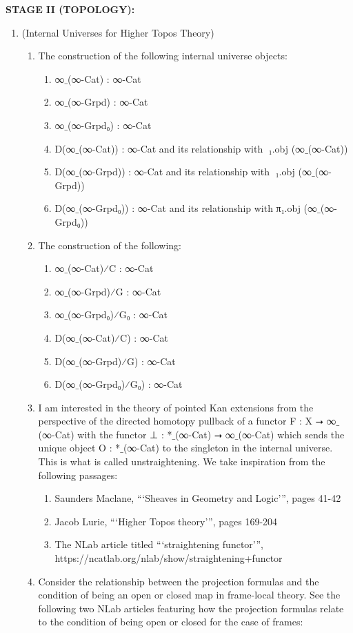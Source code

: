 \documentclass{book}
\begin{document}
{\bf STAGE II (TOPOLOGY):}
\begin{enumerate}
\item (Internal Universes for Higher Topos Theory)
\begin{enumerate}
\item The construction of the following internal universe objects:
\begin{enumerate}
\item ∞${}\_$(∞-Cat) : ∞-Cat
\item ∞${}\_$(∞-Grpd) : ∞-Cat
\item ∞${}\_$(∞-Grpd₀) : ∞-Cat
\item D⃗(∞${}\_$(∞-Cat)) : ∞-Cat and its relationship with π⃗₁.obj (∞${}\_$(∞-Cat))
\item D⃡(∞${}\_$(∞-Grpd)) : ∞-Cat and its relationship with π⃡₁.obj (∞${}\_$(∞-Grpd))
\item D(∞${}\_$(∞-Grpd₀)) : ∞-Cat and its relationship with π₁.obj (∞${}\_$(∞-Grpd₀))
\end{enumerate}
\item The construction of the following:
\begin{enumerate}
\item ∞${}\_$(∞-Cat)⁄C : ∞-Cat
\item ∞${}\_$(∞-Grpd)⁄G : ∞-Cat
\item ∞${}\_$(∞-Grpd₀)⁄G₀ : ∞-Cat
\item D⃗(∞${}\_$(∞-Cat)⁄C) : ∞-Cat
\item D⃡(∞${}\_$(∞-Grpd)⁄G) : ∞-Cat
\item D(∞${}\_$(∞-Grpd₀)⁄G₀) : ∞-Cat
\end{enumerate}
\item I am interested in the theory of pointed Kan extensions from the perspective of the directed homotopy pullback of a functor F : X ⭢ ∞$\_$(∞-Cat) with the functor ⊥ : *$\_$(∞-Cat) ⭢ ∞${}\_$(∞-Cat) which sends the unique object O : *$\_$(∞-Cat) to the singleton in the internal universe. This is what is called unstraightening. We take inspiration from the following passages:
\begin{enumerate}
\item Saunders Maclane, ```Sheaves in Geometry and Logic''', pages 41-42
\item Jacob Lurie, ```Higher Topos theory''', pages 169-204
\item The NLab article titled ```straightening functor''', https://ncatlab.org/nlab/show/straightening+functor
\end{enumerate}
\item Consider the relationship between the projection formulas and the condition of being an open or closed map in frame-local theory. See the following two NLab articles featuring how the projection formulas relate to the condition of being open or closed for the case of frames:

\end{enumerate}
\end{enumerate}
\end{document}
